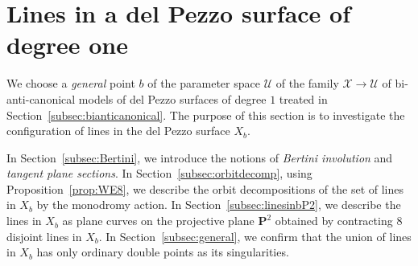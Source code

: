 \documentclass{math}
\theoremstyle{plain}
\numberwithin{equation}{section}
\newcommand{\UUU}{\mathord{\mathcal U}}
\newcommand{\XXX}{\mathord{\mathcal X}}
\newcommand{\bfP}{\mathbf{P}}
\begin{document}
  \section{Lines in a del Pezzo surface of degree one}\label{sec:lines}
%
We choose a \emph{general}  point $b$ of the parameter space $\UUU$
of the family 
$\XXX\to \UUU$ of bi-anti-canonical models of del Pezzo surfaces of degree $1$ 
treated in Section~\ref{subsec:bianticanonical}.
The purpose of this section is to 
investigate  
the configuration of lines  in the del Pezzo surface  $X_b$.
\par
In Section~\ref{subsec:Bertini}, 
we introduce the notions of 
\emph{Bertini involution} and \emph{tangent plane sections}.
In Section~\ref{subsec:orbitdecomp}, using Proposition~\ref{prop:WE8}, 
we describe the orbit decompositions
of the set of lines in $X_b$ by the monodromy action.
In Section~\ref{subsec:linesinbP2}, we describe the lines in $X_b$ as plane curves on 
the projective plane ${\bfP}^{2}$ obtained by contracting $8$ disjoint lines in $X_b$.
In Section~\ref{subsec:general}, 
we confirm that 
the union of lines in $X_b$ has only ordinary double points as its singularities.
%
\end{document}
